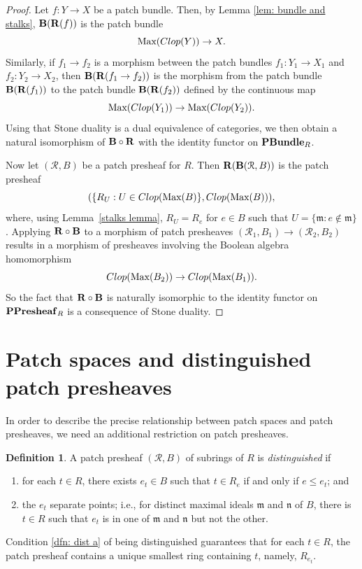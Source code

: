 \documentclass[11pt]{amsart}
\def\m{{\mathfrak m}} %
\theoremstyle{definition}
\newtheorem{definition}[theorem]{Definition}
\def\ff{\mathfrak}
\def\Max{\mbox{\rm Max}}
\def\cal{\mathcal}
\begin{document}
\begin{proof} 
Let $f:Y \rightarrow X$ be a patch bundle. Then, by Lemma \ref{lem: bundle and stalks}, ${\bf B}({\bf R}(f))$ is the patch bundle $$\Max({\rm Clop}(Y))  \rightarrow X.$$
Similarly, if $f_1\to f_2$ is a morphism between the patch bundles $f_1:Y_1\rightarrow X_1$ and $f_2:Y_2\rightarrow X_2$, then 
${\bf B}({\bf R}(f_1\to f_2))$ is the morphism from the patch bundle ${\bf B}({\bf R}(f_1))$ to the patch bundle ${\bf B}({\bf R}(f_2))$ defined by the continuous map $$\Max({\rm Clop}(Y_1)) \rightarrow \Max({\rm Clop}(Y_2)).$$ 
Using that Stone duality is a dual equivalence of categories, we then obtain a natural isomorphism of ${\bf B} \circ {\bf R}$ with the identity functor on ${\bf PBundle}_R$.

Now let $({\cal R},B)$ be a patch presheaf for $R$.  Then ${\bf R}({\bf B}({\cal R},B))$ is the patch presheaf $$(\{R_U:U \in {\rm Clop}(\Max(B)\},{\rm Clop}(\Max(B))),$$ where, using Lemma~\ref{stalks lemma}, $R_U =R_e$ for $e \in B$ such that $U = \{\ff m: e \not \in \m\}$.  Applying ${\bf R} \circ {\bf B}$ to a  morphism of patch presheaves $({\cal R}_1,B_1) \to ({\cal R}_2,B_2)$ results in a morphism of presheaves involving the Boolean algebra homomorphism $${\rm Clop}(\Max(B_2)) \rightarrow {\rm Clop}(\Max(B_1)).$$ So the fact that ${\bf R} \circ {\bf B}$ is naturally isomorphic to the identity functor on ${\bf PPresheaf}_R$ is a consequence of Stone duality.
\end{proof} 


\section{Patch spaces and distinguished patch presheaves}\label{sec: 5 patch spaces and distinguished patch presheaves}

In order to describe the precise relationship between patch spaces and patch presheaves, we need an additional restriction on patch presheaves. 

\begin{definition} \label{dfn: dist}
A patch presheaf $({\cal R}, B)$ of subrings of $R$ is {\it distinguished} if
\begin{enumerate}[label=\textup{(\alph{*})}, mode=unboxed]
\item\label{dfn: dist a} for each $t \in R$, there exists $e_t \in B$ such that $t \in R_e$ if and only if $ e \leq e_t$; and
\item\label{dfn: dist b} the $e_t$ separate points; i.e., for distinct maximal ideals $\m$ and ${\mathfrak{n}}$ of $B$, there is $t \in R$ such that  $e_t$ is in one of $\m$ and ${\mathfrak{n}}$ but not the other.
\end{enumerate}
\end{definition}
Condition \ref{dfn: dist a} of being distinguished guarantees that for each $t \in R$, the patch presheaf contains a unique smallest ring  containing $t$, namely, $R_{e_t}$. 
\end{document}
